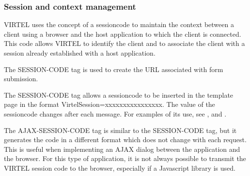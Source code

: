 \documentclass[letterpaper,10pt,english]{sphinxmanual}
\begin{document}
\subsubsection{Session and context management}
\label{\detokenize{User_Guide:session-and-context-management}}\label{\detokenize{User_Guide:v457ug-session-context-mangement}}
VIRTEL uses the concept of a sessioncode to maintain the context between a client using a browser and the host application to which the client is connected. This code allows VIRTEL to identify the client and to associate the client with a session already established with a host application.


The SESSION-CODE tag is used to create the URL associated with form submission.

\begin{sphinxVerbatim}[commandchars=\\\{\}]
  
\end{sphinxVerbatim}

The SESSION-CODE tag allows a sessioncode to be inserted in the template page in the format VirtelSession=xxxxxxxxxxxxxxxx. The value of the sessioncode changes after each message. For examples of its use, see {\hyperref[\detokenize{User_Guide:v457ug-transmitting-data}]{}}, and {\hyperref[\detokenize{User_Guide:v457ug-printing}]{}}.


The AJAX-SESSION-CODE tag is similar to the SESSION-CODE tag, but it generates the code in a different format which does not change with each request. This is useful when implementing an AJAX dialog between the application and the browser. For this type of application, it is not always possible to transmit the VIRTEL session code to the browser, especially if a Javascript library is used.

\begin{sphinxVerbatim}[commandchars=\\\{\}]
  
\end{sphinxVerbatim}
\end{document}
